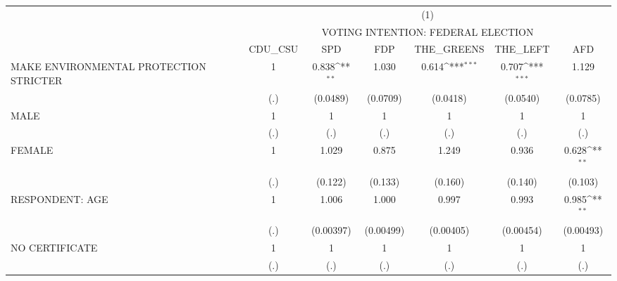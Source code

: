 {
\def\sym#1{\ifmmode^{#1}\else\(^{#1}\)\fi}
\begin{tabular}{l*{6}{c}}
\hline\hline
                              &\multicolumn{6}{c}{(1)}                                                                                                \\
                              &\multicolumn{6}{c}{VOTING INTENTION: FEDERAL ELECTION}                                                                 \\
                              &   CDU\_CSU         &       SPD         &       FDP         &THE\_GREENS         &  THE\_LEFT         &       AFD         \\
\hline
MAKE ENVIRONMENTAL PROTECTION STRICTER&         1         &     0.838\sym{**} &     1.030         &     0.614\sym{***}&     0.707\sym{***}&     1.129         \\
                              &       (.)         &  (0.0489)         &  (0.0709)         &  (0.0418)         &  (0.0540)         &  (0.0785)         \\
[1em]
MALE                          &         1         &         1         &         1         &         1         &         1         &         1         \\
                              &       (.)         &       (.)         &       (.)         &       (.)         &       (.)         &       (.)         \\
[1em]
FEMALE                        &         1         &     1.029         &     0.875         &     1.249         &     0.936         &     0.628\sym{**} \\
                              &       (.)         &   (0.122)         &   (0.133)         &   (0.160)         &   (0.140)         &   (0.103)         \\
[1em]
RESPONDENT: AGE               &         1         &     1.006         &     1.000         &     0.997         &     0.993         &     0.985\sym{**} \\
                              &       (.)         & (0.00397)         & (0.00499)         & (0.00405)         & (0.00454)         & (0.00493)         \\
[1em]
NO CERTIFICATE                &         1         &         1         &         1         &         1         &         1         &         1         \\
                              &       (.)         &       (.)         &       (.)         &       (.)         &       (.)         &       (.)         \\

\end{tabular}}
